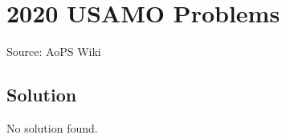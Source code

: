 \documentclass[12pt]{article}
\begin{document}
\section*{{2020 USAMO Problems}}
Source: AoPS Wiki

\subsection*{Solution}
No solution found.
\end{document}
